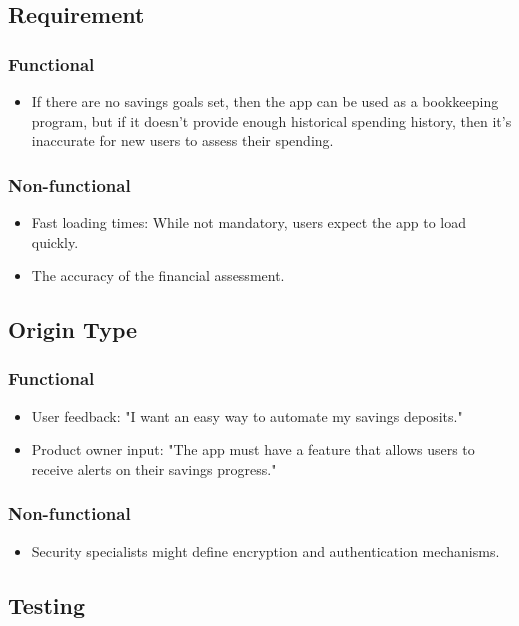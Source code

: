 \documentclass{article}
\begin{document}
\subsection{Requirement}
\subsubsection{Functional}
\begin{itemize}
    \item If there are no savings goals set, then the app can be used as a bookkeeping program, but if it doesn’t provide enough historical spending history, then it's inaccurate for new users to assess their spending.
\end{itemize}
\subsubsection{Non-functional}
\begin{itemize}
    \item Fast loading times: While not mandatory, users expect the app to load quickly.
    \item The accuracy of the financial assessment.
\end{itemize}

\subsection{Origin Type}
\subsubsection{Functional}
\begin{itemize}
    \item User feedback: "I want an easy way to automate my savings deposits."
    \item Product owner input: "The app must have a feature that allows users to receive alerts on their savings progress."
\end{itemize}
\subsubsection{Non-functional}
\begin{itemize}
    \item Security specialists might define encryption and authentication mechanisms.
\end{itemize}

\subsection{Testing}
\end{document}
